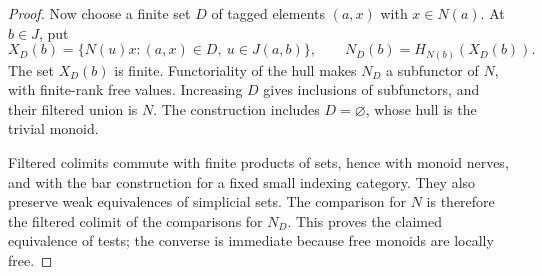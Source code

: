 \begin{proof}
Now choose a finite set $D$ of tagged elements $(a,x)$ with
$x\in N(a)$. At $b\in J$, put
\[
 X_D(b)=\{N(u)x:(a,x)\in D,\ u\in J(a,b)\},
 \qquad N_D(b)=H_{N(b)}(X_D(b)).
\]
The set $X_D(b)$ is finite. Functoriality of the hull makes $N_D$
a subfunctor of $N$, with finite-rank free values. Increasing
$D$ gives inclusions of subfunctors, and their filtered union
is $N$. The construction includes $D=\varnothing$, whose hull
is the trivial monoid.

Filtered colimits commute with finite products of sets, hence
with monoid nerves, and with the bar construction for a fixed
small indexing category. They also preserve weak equivalences
of simplicial sets. The comparison for $N$ is therefore the
filtered colimit of the comparisons for $N_D$. This proves the
claimed equivalence of tests; the converse is immediate because
free monoids are locally free.
\end{proof}

